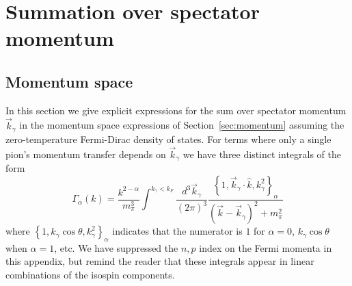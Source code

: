 \chapter{Summation over spectator momentum}

\section{\label{app:momSums}Momentum space}

In this section we give explicit expressions for the sum over spectator momentum $\vec{k}_\gamma$ in the momentum space expressions of Section~\ref{sec:momentum} assuming the zero-temperature Fermi-Dirac density of states. For terms where only a single pion's momentum transfer depends on $\vec{k}_\gamma$ we have three distinct integrals of the form 
\begin{equation}
\Gamma_{\alpha}(k) = \frac{k^{2-\alpha}}{m_\pi^3}\int^{k_\gamma<k_F}\frac{d^3\vec{k}_\gamma}{(2\pi)^3}  \frac{\left\{1,\vec{k}_\gamma\cdot\hat{k},k_\gamma^2\right\}_\alpha}{(\vec{k}-\vec{k}_\gamma)^2+m_\pi^2}
\end{equation}
where $\left\{1,k_\gamma\cos\theta,k_\gamma^2\right\}_\alpha$ indicates that the numerator is $1$ for $\alpha=0$, $k_\gamma\cos\theta$ when $\alpha=1$, etc. We have suppressed the $n,p$ index on the Fermi momenta in this appendix, but remind the reader that these integrals appear in linear combinations of the isospin components.

